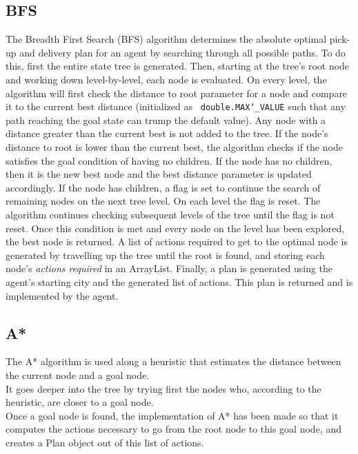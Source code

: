 \documentclass[11pt]{article}
\begin{document}
\subsection{BFS}
The Breadth First Search (BFS) algorithm determines the absolute optimal pick-up and delivery plan for an agent by searching through all possible paths. To do this, first the entire state tree is generated. Then, starting at the tree's root node and working down level-by-level, each node is evaluated. On every level, the algorithm will first check the distance to root parameter for a node and compare it to the current best distance (initialized as \texttt{ double.MAX\char`_VALUE} such that any path reaching the goal state can trump the default value). Any node with a distance greater than the current best is not added to the tree. If the node's distance to root is lower than the current best, the algorithm checks if the node satisfies the goal condition of having no children. If the node has no children, then it is the new best node and the best distance parameter is updated accordingly. If the node has children, a flag is set to continue the search of remaining nodes on the next tree level. On each level the flag is reset. The algorithm continues checking subsequent levels of the tree until the flag is not reset. Once this condition is met and every node on the level has been explored, the best node is returned. A list of actions required to get to the optimal node is generated by travelling up the tree until the root is found, and storing each node's \textit{actions required} in an ArrayList. Finally, a plan is generated using the agent's starting city and the generated list of actions. This plan is returned and is implemented by the agent. 
\subsection{A*}
The A* algorithm is used along a heuristic that estimates the distance between the current node and a goal node.\\

It goes deeper into the tree by trying first the nodes who, according to the heuristic, are closer to a goal node.\\

Once a goal node is found, the implementation of A* has been made so that it computes the actions necessary to go from the root node to this goal node, and creates a Plan object out of this list of actions.\\
\end{document}
